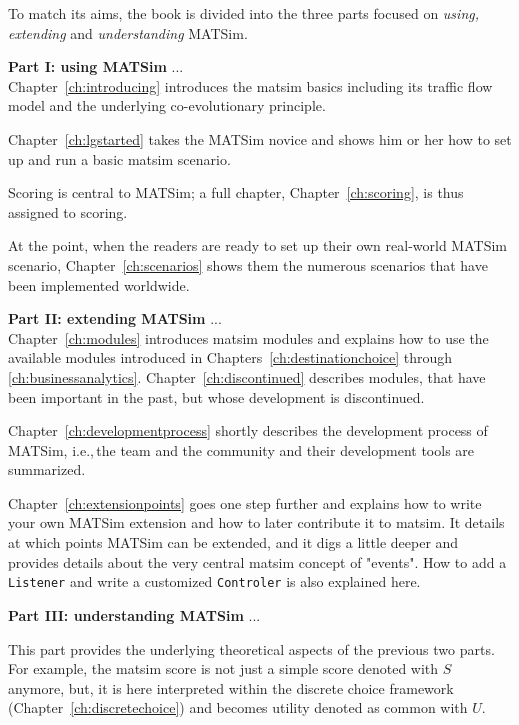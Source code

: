 To match its aims, the book is divided into the three parts focused on \emph{using, extending} and \emph{understanding} MATSim. 

\textbf{Part I: using MATSim} ... \\
Chapter~\ref{ch:introducing} introduces the \gls{matsim} basics including its traffic flow model and the underlying co-evolutionary principle. 

Chapter~\ref{ch:lgstarted} takes the MATSim novice and shows him or her how to set up and run a basic \gls{matsim} scenario. 

Scoring is central to MATSim; a full chapter, Chapter~\ref{ch:scoring}, is thus assigned to scoring. 

At the point, when the readers are ready to set up their own real-world MATSim \gls{scenario}, Chapter~\ref{ch:scenarios} shows them the numerous scenarios that have been implemented worldwide. 

\textbf{Part II: extending MATSim} ... \\
Chapter~\ref{ch:modules} introduces \gls{matsim} modules and explains how to use the available modules introduced in Chapters~\ref{ch:destinationchoice} through \ref{ch:businessanalytics}. Chapter~\ref{ch:discontinued} describes modules, that have been important in the past, but whose development is discontinued.

Chapter~\ref{ch:developmentprocess} shortly describes the development process of MATSim, i.e.,\,the team and the community and their development tools are summarized. 

Chapter~\ref{ch:extensionpoints} goes one step further and explains how to write your own MATSim extension and how to later contribute it to \gls{matsim}. It details at which points MATSim can be extended, and it digs a little deeper and provides details about the very central \gls{matsim} concept of "events". How to add a \lstinline|Listener| and write a customized \lstinline|Controler| is also explained here.

\textbf{Part III: understanding MATSim} ... \\


This part provides the underlying theoretical aspects of the previous two parts. For example, the \gls{matsim} score is not just a simple score denoted with $S$ anymore, but, it is here interpreted within the discrete choice framework (Chapter~\ref{ch:discretechoice}) and becomes utility denoted as common with $U$. 

